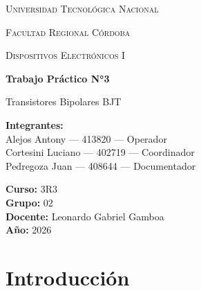 \documentclass[12pt,a4paper]{article}
\begin{document}
\hypersetup{pageanchor=false}
\begin{titlepage}
    \centering

    {\scshape\LARGE Universidad Tecnológica Nacional \par}
    \vspace{0.3cm}
    {\scshape\Large Facultad Regional Córdoba \par}
    \vspace{1.5cm}

    {\scshape\Large Dispositivos Electrónicos I \par}
    \vspace{2cm}

    {\Huge\bfseries Trabajo Práctico N°3 \par}
    \vspace{0.5cm}
    {\LARGE Transistores Bipolares BJT \par}

    \vspace{2cm}

    \begin{flushleft}
    \textbf{Integrantes:} \\
    Alejos Antony --- 413820 --- Operador\\
    Cortesini Luciano --- 402719 --- Coordinador\\
    Pedregoza Juan --- 408644 --- Documentador\\

    \vspace{0.5cm}

    \textbf{Curso:} 3R3 \\
    \textbf{Grupo:} 02 \\
    \textbf{Docente:}  Leonardo Gabriel Gamboa\\
    \textbf{Año:} 2026 \\
    \end{flushleft}

    \vfill

\end{titlepage}
\hypersetup{pageanchor=true}
\thispagestyle{empty}

\pagestyle{fancy}

\vspace{1cm}

\tableofcontents
\newpage

\section{Introducción}
\end{document}
